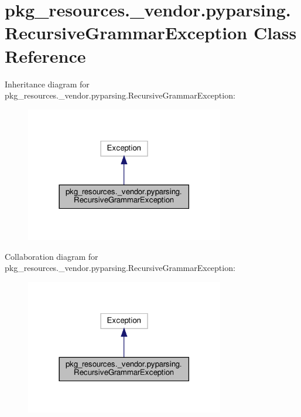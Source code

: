\hypertarget{classpkg__resources_1_1__vendor_1_1pyparsing_1_1RecursiveGrammarException}{}\section{pkg\+\_\+resources.\+\_\+vendor.\+pyparsing.\+Recursive\+Grammar\+Exception Class Reference}
\label{classpkg__resources_1_1__vendor_1_1pyparsing_1_1RecursiveGrammarException}


Inheritance diagram for pkg\+\_\+resources.\+\_\+vendor.\+pyparsing.\+Recursive\+Grammar\+Exception\+:
\nopagebreak
\begin{figure}[H]
\begin{center}
\leavevmode
\includegraphics[width=246pt]{classpkg__resources_1_1__vendor_1_1pyparsing_1_1RecursiveGrammarException__inherit__graph}
\end{center}
\end{figure}


Collaboration diagram for pkg\+\_\+resources.\+\_\+vendor.\+pyparsing.\+Recursive\+Grammar\+Exception\+:
\nopagebreak
\begin{figure}[H]
\begin{center}
\leavevmode
\includegraphics[width=246pt]{classpkg__resources_1_1__vendor_1_1pyparsing_1_1RecursiveGrammarException__coll__graph}
\end{center}
\end{figure}
